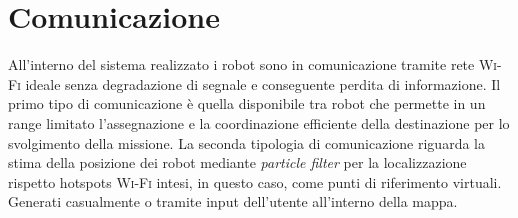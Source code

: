 \section{Comunicazione}
All'interno del sistema realizzato i robot sono in comunicazione tramite rete
\textsc{Wi-Fi} ideale senza degradazione di segnale e conseguente perdita di
informazione.
Il primo tipo di comunicazione è quella disponibile tra robot che permette in
un range limitato l'assegnazione e la coordinazione efficiente della
destinazione per lo svolgimento della missione.
La seconda tipologia di comunicazione riguarda la stima della posizione dei
robot mediante \emph{particle filter} per la localizzazione rispetto hotspots 
\textsc{Wi-Fi} intesi, in questo caso, come punti di riferimento virtuali.
Generati casualmente o tramite input dell'utente all'interno
della mappa.
